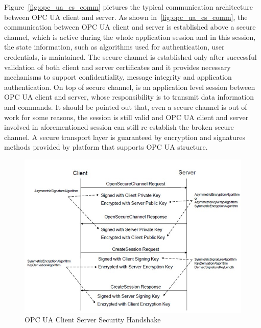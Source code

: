 \documentclass[]{llncs}
\begin{document}
Figure~\ref{fig:opc_ua_cs_comm} pictures the typical communication architecture between OPC UA client and server. As shown in~\ref{fig:opc_ua_cs_comm}, the communication between OPC UA client and server is established above a secure channel, which is active during the whole application session and in this session, the state information, such as algorithms used for authentication, user credentials, is maintained. The secure channel is established only after successful validation of both client and server certificates and it provides necessary mechanisms to support confidentiality, message integrity and application authentication. On top of secure channel, is an application level session between OPC UA client and server, whose responsibility is to transmit data information and commands. It should be pointed out that, even a secure channel is out of work for some reasons, the session is still valid and OPC UA client and server involved in aforementioned session can still re-establish the broken secure channel. A secure transport layer is guaranteed by encryption and signatures methods provided by platform that supports OPC UA structure.

\begin{figure}[!htbp]
	\centering
	\includegraphics[width=1\textwidth]{opc_ua_shs.jpg}
		\caption[ ]{OPC UA Client Server Security Handshake\cite{O2}}
	\label{fig:opc_ua_cs_shs}
\end{figure}
\end{document}
